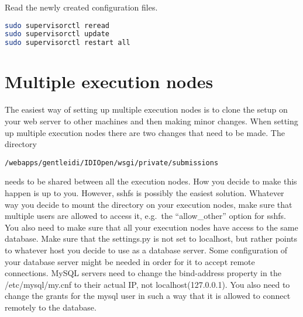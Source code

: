 Read the newly created configuration files.
\begin{lstlisting}[language=bash]
sudo supervisorctl reread
sudo supervisorctl update
sudo supervisorctl restart all
\end{lstlisting}

\section{Multiple execution nodes}
The easiest way of setting up multiple execution nodes is to clone the
setup on your web server to other machines and then making minor
changes.
When setting up multiple execution nodes there are two changes that need to be
made. The directory \begin{verbatim}/webapps/gentleidi/IDIOpen/wsgi/private/submissions\end{verbatim}
needs to be shared between all the execution nodes. How you decide to make this
happen is up to you. However, sshfs is possibly the easiest solution. Whatever
way you decide to mount the directory on your execution nodes, make sure that
multiple users are allowed to access it, e.g.\ the ``allow\_other''
option for sshfs.
You also need to make sure that all your execution nodes have access to the
same database. Make sure that the settings.py is not set to localhost, but
rather points to whatever host you decide to use as a database server. Some
configuration of your database server might be needed in order for it to accept
remote connections. MySQL servers need to change the bind-address property in
the /etc/mysql/my.cnf to their actual IP, not localhost(127.0.0.1).
You also need to change the grants for the mysql user in such a way that it is
allowed to connect remotely to the database.
